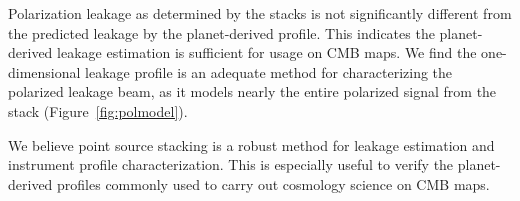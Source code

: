 Polarization leakage as determined by the stacks is not significantly different from the predicted leakage by the planet-derived profile.  This indicates the planet-derived leakage estimation is sufficient for usage on CMB maps.  We find the one-dimensional leakage profile is an adequate method for characterizing the polarized leakage beam, as it models nearly the entire polarized signal from the stack (Figure~\ref{fig:polmodel}).

We believe point source stacking is a robust method for leakage estimation and instrument profile characterization.  This is especially useful to verify the planet-derived profiles commonly used to carry out cosmology science on CMB maps.
